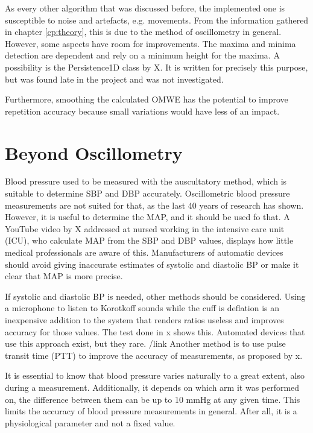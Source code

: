 As every other algorithm that was discussed before, the implemented one is susceptible to noise and artefacts, e.g. movements. From the information gathered in chapter \ref{cp:theory}, this is due to the method of oscillometry in general. However, some aspects have room for improvements. The maxima and minima detection are dependent and rely on a minimum height for the maxima. A possibility is the Persistence1D class by X. It is written for precisely this purpose, but was found late in the project and was not investigated.

Furthermore, smoothing the calculated OMWE has the potential to improve repetition accuracy because small variations would have less of an impact.

\section{Beyond Oscillometry}

Blood pressure used to be measured with the auscultatory method, which is suitable to determine SBP and DBP accurately. Oscillometric blood pressure measurements are not suited for that, as the last 40 years of research has shown. However, it is useful to determine the MAP, and it should be used fo that. A YouTube video by X addressed at nursed working in the intensive care unit (ICU), who calculate MAP from the SBP and DBP values, displays how little medical professionals are aware of this. Manufacturers of automatic devices should avoid giving inaccurate estimates of systolic and diastolic BP or make it clear that MAP is more precise.

If systolic and diastolic BP is needed, other methods should be considered. Using a microphone to listen to Korotkoff sounds while the cuff is deflation is an inexpensive addition to the system that renders ratios useless and improves accuracy for those values. The test done in x shows this. Automated devices that use this approach exist, but they rare. /link
Another method is to use pulse transit time (PTT) to improve the accuracy of measurements, as proposed by x. 

It is essential to know that blood pressure varies naturally to a great extent, also during a measurement. Additionally, it depends on which arm it was performed on, the difference between them can be up to 10 mmHg at any given time. This limits the accuracy of blood pressure measurements in general. After all, it is a physiological parameter and not a fixed value.

